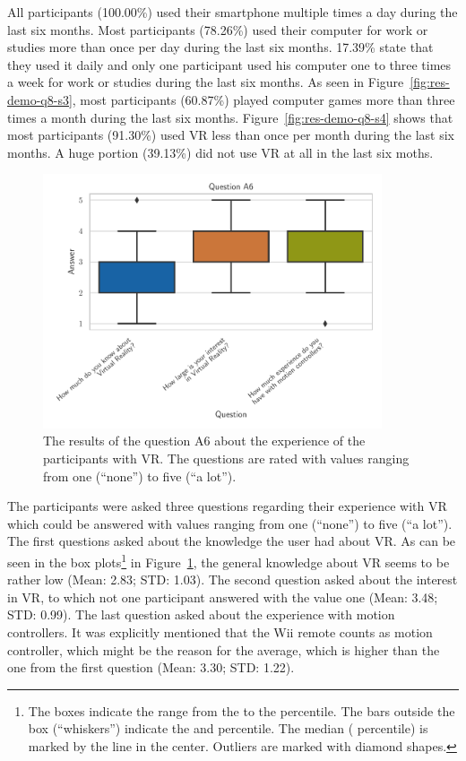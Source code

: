All participants (100.00\%) used their smartphone multiple times a day during the last six months. Most participants (78.26\%) used their computer for work or studies more than once per day during the last six months. 17.39\% state that they used it daily and only one participant used his computer one to three times a week for work or studies during the last six months. As seen in Figure~\ref{fig:res-demo-q8-s3}, most participants (60.87\%) played computer games more than three times a month during the last six months. Figure~\ref{fig:res-demo-q8-s4} shows that most participants (91.30\%) used \ac{VR} less than once per month during the last six months. A huge portion (39.13\%) did not use \ac{VR} at all in the last six moths.

\begin{figure}[H]
  \centering
  \includegraphics[width=10cm]{figures/evaluation/res_demo_q9.pdf}
  \caption[VR experience of the participants]{The results of the question A6 about the experience of the participants with \ac{VR}. The questions are rated with values ranging from one (\enquote{none}) to five (\enquote{a lot}).}\label{fig:res-demo-q9}
\end{figure}

The participants were asked three questions regarding their experience with \ac{VR} which could be answered with values ranging from one (\enquote{none}) to five (\enquote{a lot}). The first questions asked about the knowledge the user had about \ac{VR}. As can be seen in the box plots\footnote{The boxes indicate the range from the  to the  percentile. The bars outside the box (\enquote{whiskers}) indicate the  and  percentile. The median ( percentile) is marked by the line in the center. Outliers are marked with diamond shapes.} in Figure~\ref{fig:res-demo-q9}, the general knowledge about \ac{VR} seems to be rather low (Mean: 2.83; \ac{STD}: 1.03). The second question asked about the interest in \ac{VR}, to which not one participant answered with the value one (Mean: 3.48; \ac{STD}: 0.99). The last question asked about the experience with motion controllers. It was explicitly mentioned that the Wii remote counts as motion controller, which might be the reason for the average, which is higher than the one from the first question (Mean: 3.30; \ac{STD}: 1.22).




